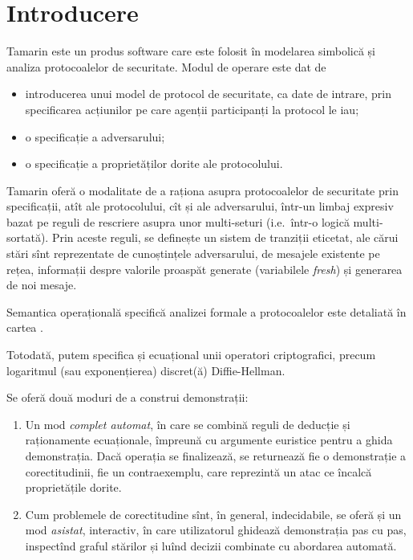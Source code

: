 
\chapter{Introducere}

Tamarin este un produs software care este folosit în modelarea simbolică
și analiza protocoalelor de securitate. Modul de operare este dat de
\begin{itemize}
    \item introducerea unui model de protocol de securitate, ca date de intrare,
        prin specificarea acțiunilor pe care agenții participanți la protocol
        le iau;
    \item o specificație a adversarului;
    \item o specificație a proprietăților dorite ale protocolului.
\end{itemize}

Tamarin oferă o modalitate de a raționa asupra protocoalelor de securitate
prin specificații, atît ale protocolului, cît și ale adversarului, într-un
limbaj expresiv bazat pe reguli de rescriere asupra unor multi-seturi
(i.e.\ într-o logică multi-sortată). Prin aceste reguli, se definește un
sistem de tranziții eticetat, ale cărui stări sînt reprezentate de
cunoștințele adversarului, de mesajele existente pe rețea, informații
despre valorile proaspăt generate (variabilele \emph{fresh}) și
generarea de noi mesaje.

Semantica operațională specifică analizei formale a protocoalelor
este detaliată în cartea \cite[Cap.\ 3]{crem}.

Totodată, putem specifica și ecuațional unii operatori criptografici,
precum logaritmul (sau exponențierea) discret(ă) Diffie-Hellman.

Se oferă două moduri de a construi demonstrații:
\begin{enumerate}[(1)]
    \item Un mod \emph{complet automat}, în care se combină reguli
        de deducție și raționamente ecuaționale, împreună cu argumente
        euristice pentru a ghida demonstrația. Dacă operația se finalizează,
        se returnează fie o demonstrație a corectitudinii, fie un
        contraexemplu, care reprezintă un atac ce încalcă proprietățile
        dorite.
    \item Cum problemele de corectitudine sînt, în general, indecidabile,
        se oferă și un mod \emph{asistat}, interactiv, în care utilizatorul
        ghidează demonstrația pas cu pas, inspectînd graful stărilor și
        luînd decizii combinate cu abordarea automată.
\end{enumerate}

